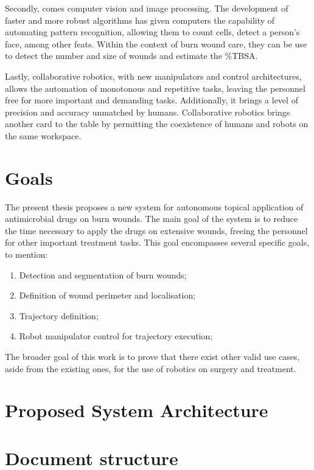 Secondly, comes computer vision and image processing. The development of faster and more robust algorithms has given computers the capability of automating pattern recognition, allowing them to count cells, detect a person's face, among other feats. Within the context of burn wound care, they can be use to detect the number and size of wounds and estimate the \%TBSA. 

Lastly, collaborative robotics, with new manipulators and control architectures, allows the automation of monotonous and repetitive tasks, leaving the personnel free for more important and demanding tasks. Additionally, it brings a level of precision and accuracy unmatched by humans. Collaborative robotics brings another card to the table by permitting the coexistence of humans and robots on the same workspace.


\section{Goals} %
\label{sec:goals}

The present thesis proposes a new system for autonomous topical application of antimicrobial drugs on burn wounds. The main goal of the system is to reduce the time necessary to apply the drugs on extensive wounds, freeing the personnel for other important treatment tasks. This goal encompasses several specific goals, to mention:
\begin{enumerate}
    \item Detection and segmentation of burn wounds;
    \item Definition of wound perimeter and localisation;
    \item Trajectory definition;
    \item Robot manipulator control for trajectory execution;
\end{enumerate}
The broader goal of this work is to prove that there exist other valid use cases, aside from the existing ones, for the use of robotics on surgery and treatment.


\section{Proposed System Architecture} %
\label{sec:proposed_system_architecture}


\section{Document structure}
\label{sec:document_structure}

